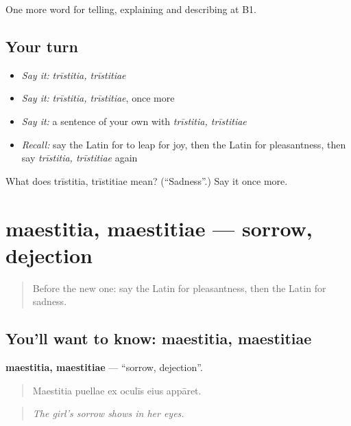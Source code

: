 \begin{grammarlens}[title={What you've built}]
One more word for telling, explaining and describing at B1.
\end{grammarlens}

\subsection*{Your turn}
\begin{itemize}
\raggedright
  \item \emph{Say it:} \emph{trīstitia, trīstitiae}
  \item \emph{Say it:} \emph{trīstitia, trīstitiae}, once more
  \item \emph{Say it:} a sentence of your own with \emph{trīstitia, trīstitiae}
  \item \emph{Recall:} say the Latin for to leap for joy, then the Latin for pleasantness, then say \emph{trīstitia, trīstitiae} again
\end{itemize}

\begin{tcolorbox}[breakable,colback=teal!4,colframe=teal!35!black,title={Before you move on}]
What does trīstitia, trīstitiae mean? (\textquotedblleft{}Sadness\textquotedblright{}.) Say it once more.
\end{tcolorbox}
\section[maestitia, maestitiae]{maestitia, maestitiae — sorrow, dejection}

\label{lesson:LA-C490-maestitia}



\begin{quote}
Before the new one: say the Latin for pleasantness, then the Latin for sadness.
\end{quote}

\subsection*{You'll want to know: maestitia, maestitiae}
\textbf{maestitia, maestitiae} — \textquotedblleft{}sorrow, dejection\textquotedblright{}.

\begin{quote}
Maestitia puellae ex oculīs eius appāret.
\end{quote}

\begin{quote}
\emph{The girl's sorrow shows in her eyes.}
\end{quote}

